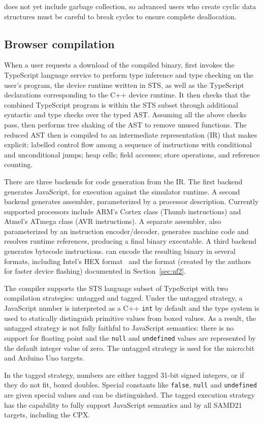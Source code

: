 \MC does not yet include garbage collection, so advanced users who create cyclic
data structures must be careful to break cycles to ensure complete deallocation.

\subsection{Browser compilation}

When a user requests a download of the compiled binary, \MC first invokes the TypeScript language service to perform type inference and type checking on the
user's program, the device runtime written in STS, as well as the TypeScript declarations
corresponding to the C++ device runtime. It then checks that the
combined TypeScript program is within the STS subset through additional syntactic and type checks over the typed AST.  Assuming all the
above checks pass, \MC then performs tree shaking of the AST to remove unused functions.
The reduced AST then is compiled to an intermediate representation (IR) that makes explicit: labelled control
flow among a sequence of instructions with conditional and unconditional jumps; heap cells; field accesses; store operations,
and reference counting.

There are three backends for code generation from the IR. The first backend generates JavaScript, for execution against the simulator runtime.  A second backend generates assembler, parameterized by a processor description.  Currently supported processors include ARM's Cortex class (Thumb instructions) and Atmel's ATmega class (AVR instructions). A separate assembler, also parameterized by an instruction encoder/decoder, generates machine code and resolves runtime references, producing a final binary executable. A third backend generates bytecode instructions. \MC can encode the resulting binary in several formats, including Intel's HEX format~\cite{IntelHEX} and the \UF format (created by the authors for faster device flashing) documented in Section~\ref{sec:uf2}.

\label{sec:untagged-tagged}
The \MC compiler supports the STS language subset of TypeScript
with two compilation strategies: untagged and tagged. Under the untagged strategy,
a JavaScript number is interpreted as a C++ \texttt{int} by default and the type system is used
to statically distinguish primitive values from boxed values. As a result, the untagged
strategy is not fully faithful to JavaScript semantics: there is no support for floating
point and the \texttt{null} and \texttt{undefined} values are represented by the default integer value of zero. The untagged strategy is used for the micro:bit and Arduino Uno targets.

In the tagged strategy, numbers are either tagged 31-bit signed integers, or if they do not fit, boxed doubles. Special constants like \texttt{false}, \texttt{null} and \texttt{undefined} are given special values and can be distinguished. The tagged execution strategy has the capability to fully support JavaScript semantics and by all SAMD21 targets, including the CPX.
